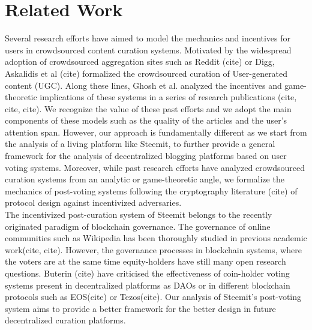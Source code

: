 \section{Related Work}
  Several research efforts have aimed to model the mechanics and incentives for users in crowdsourced content curation systems. Motivated by the widespread adoption of crowdsourced aggregation sites such as Reddit (cite) or Digg, Askalidis et al (cite) formalized the crowdsourced curation of User-generated content (UGC). Along these lines, Ghosh et al. analyzed the incentives and game-theoretic implications of these systems in a series of research publications (cite, cite, cite). We recognize the value of these past efforts and we adopt the main components of these models such as the quality of the articles and the user's attention span. However, our approach is fundamentally different as we start from the analysis of a living platform like Steemit, to further provide a general framework for the analysis of decentralized blogging platforms based on user voting systems. Moreover, while past research efforts have analyzed crowdsourced curation systems from an analytic or game-theoretic angle, we formalize the mechanics of post-voting systems following the cryptography literature (cite) of protocol design against incentivized adversaries.\\
  
  The incentivized post-curation system of Steemit belongs to the recently originated paradigm of blockchain governance. The governance of online communities such as Wikipedia has been thoroughly studied in previous academic work(cite, cite). However, the governance processes in blockchain systems, where the voters are at the same time equity-holders have still many open research questions. Buterin (cite) have criticised the effectiveness of coin-holder voting systems present in decentralized platforms as DAOs or in different blockchain protocols such as EOS(cite) or Tezos(cite). Our analysis of Steemit's post-voting system aims to provide a better framework for the better design in future decentralized curation platforms.
  
  
